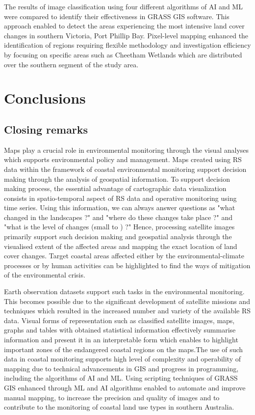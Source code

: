 \documentclass[jmse,article,submit,pdftex,moreauthors]{Definitions/mdpi}
\begin{document}
The results of image classification using four different algorithms of AI and ML were compared to identify their effectiveness in GRASS GIS software. This approach enabled to detect the areas experiencing the most intensive land cover changes in southern Victoria, Port Phillip Bay. Pixel-level mapping enhanced the identification of regions requiring flexible methodology and investigation efficiency by focusing on specific areas such as Cheetham Wetlands which are distributed over the southern segment of the study area. 

\section{Conclusions}

\subsection{Closing remarks}
Maps play a crucial role in environmental monitoring through the visual analyses which supports environmental policy and management. Maps created using RS data within the framework of coastal environmental monitoring support decision making through the analysis of geospatial information. To support decision making process, the essential advantage of cartographic data visualization consists in spatio-temporal aspect of RS data and operative monitoring using time series. Using this information, we can always answer questions as "what changed in the landscapes ?" and "where do these changes take place ?" and "what is the level of changes (small to ) ?" Hence, processing satellite images primarily support such decision making and geospatial analysis through the visualised extent of the affected areas and mapping the exact location of land cover changes. Target coastal areas affected either by the environmental-climate processes or by human activities can be highlighted to find the ways of mitigation of the environmental crisis. 

Earth observation datasets support such tasks in the environmental monitoring. This becomes possible due to the significant development of satellite missions and techniques which resulted in the increased number and variety of the available RS data. Visual forms of representation such as classified satellite images, maps, graphs and tables with obtained statistical information effectively summarise information and present it in an interpretable form which enables to highlight important zones of the endangered coastal regions on the maps.The use of such data in coastal monitoring supports high level of complexity and operability of mapping due to technical advancements in GIS and progress in programming, including the algorithms of AI and ML. Using scripting techniques of GRASS GIS enhanced through ML and AI algorithms enabled to automate and improve manual mapping, to increase the precision and quality of images and to contribute to the monitoring of coastal land use types in southern Australia. 
\end{document}
